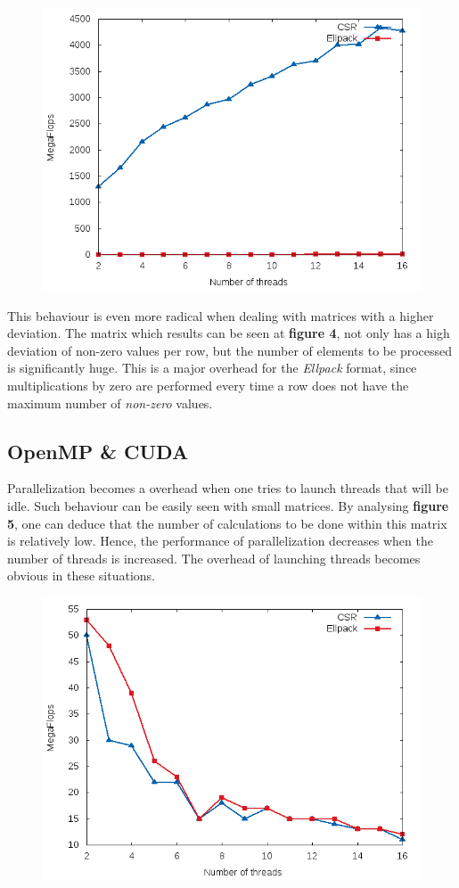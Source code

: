 \documentclass[12pt]{article}
\begin{document}
\begin{figure}[!htb]
\centering
\includegraphics[width=.5\linewidth]{OMP_1M.png}
\end{figure}

\par This behaviour is even more radical when dealing with matrices with a higher deviation. The matrix which results can be seen at \textbf{figure 4}, not only has a high deviation of non-zero values per row, but the number of elements to be processed is significantly huge. This is a major overhead for the \textit{Ellpack} format, since multiplications by zero are performed every time a row does not have the maximum number of \textit{non-zero} values.

\subsection*{OpenMP \& CUDA}

\par Parallelization becomes a overhead when one tries to launch threads that will be idle. Such behaviour can be easily seen with small matrices. By analysing \textbf{figure 5}, one can deduce that the number of calculations to be done within this matrix is relatively low. Hence, the performance of parallelization decreases when the number of threads is increased. The overhead of launching threads becomes obvious in these situations. 
\par 
\begin{figure}[!htb]
\centering
\includegraphics[width=.5\linewidth]{OMP_cage4.png}
\end{figure}
\end{document}
